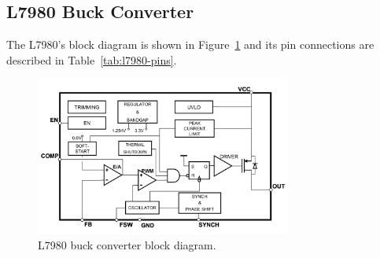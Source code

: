 \subsection{L7980 Buck Converter}
\label{sec:l7980-buck}

The L7980's block diagram is shown in Figure~\ref{fig:l7980-block-diagram} and its pin connections
are described in Table~\ref{tab:l7980-pins}.

\begin{figure}[h]
  \centering
  \includegraphics[width=0.75\textwidth]{data/l7980-block-diagram}
  \caption{L7980 buck converter block diagram.}
  \label{fig:l7980-block-diagram}
\end{figure}

